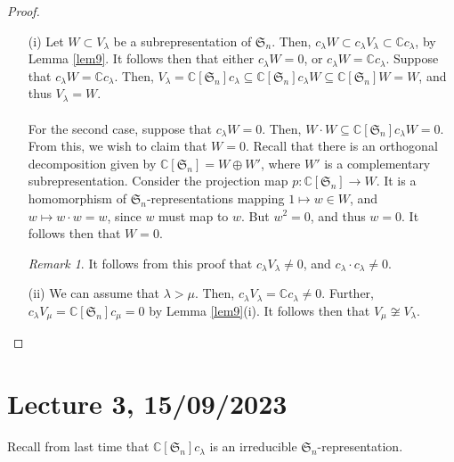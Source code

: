 \documentclass[a4paper]{report}
\theoremstyle{definition}
\theoremstyle{remark}
\newtheorem{remark}{Remark}
\theoremstyle{proposition}
\theoremstyle{conjecture}
\theoremstyle{lemma}
\theoremstyle{corollary}
\theoremstyle{exercise}
\theoremstyle{example}
\newcommand{\C}{\mathbb{C}}
\begin{document}
\begin{proof}
    \leavevmode 
    \begin{itemize}
        \item[(i)] Let $W\subset V_\lambda$ be a subrepresentation of $\mathfrak{S}_n$.
            Then, $c_\lambda W \subset c_\lambda V_\lambda \subset \C c_\lambda$,
            by Lemma \ref{lem9}.
            It follows then that either $c_\lambda W = 0$, or 
            $c_\lambda W = \C c_\lambda$.
            Suppose that $c_\lambda W = \C c_\lambda$.
            Then, $V_\lambda = \C[\mathfrak{S}_n]c_\lambda\subseteq \C[\mathfrak{S}_n]c_\lambda W \subseteq \C[\mathfrak{S}_n]W = W$,
            and thus $V_\lambda = W$.\\\\
            For the second case, suppose that $c_\lambda W = 0$. Then,
            $W\cdot W \subseteq \C[\mathfrak{S}_n]c_\lambda W = 0$.
            From this, we wish to claim that $W=0$.
            Recall that there is an orthogonal decomposition given by
            $\C[\mathfrak{S}_n] = W \oplus W'$, where $W'$ is a complementary
            subrepresentation. Consider the projection map 
            $p : \C[\mathfrak{S}_n] \to W$. It is a homomorphism of 
            $\mathfrak{S}_n$-representations mapping 
            $1 \mapsto w\in W$, and $w \mapsto w\cdot w = w$, since 
            $w$ must map to $w$.
            But $w^2 = 0$, and thus $w =0$. It follows then that 
            $W=0$.
            \begin{remark}
                It follows from this proof that $c_\lambda V_\lambda \neq 0$, and 
                $c_\lambda\cdot c_\lambda \neq 0$.
            \end{remark}
        \item[(ii)] We can assume that $\lambda > \mu$. Then, 
            $c_\lambda V_\lambda = \C c_\lambda \neq 0$.
            Further, $c_\lambda V_\mu = \C[\mathfrak{S}_n]c_\mu = 0$ by 
            Lemma \ref{lem9}(i).
            It follows then that $V_\mu \not\cong V_\lambda$.
    \end{itemize}
\end{proof}

\section{Lecture 3, 15/09/2023}

Recall from last time that $\C[\mathfrak{S}_n]c_\lambda$ is an irreducible
$\mathfrak{S}_n$-representation.
\end{document}
